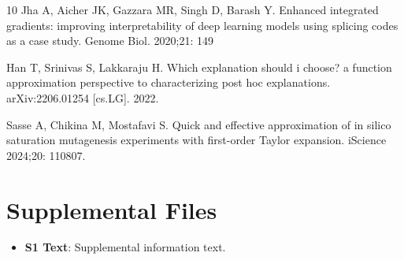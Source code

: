 \documentclass[10pt,letterpaper]{article}
\begin{document}
\begin{thebibliography}{10}
 Jha A, Aicher JK, Gazzara MR, Singh D, Barash Y. Enhanced integrated gradients: improving interpretability of deep learning models using splicing codes as a case study. Genome Biol. 2020;21: 149

 Han T, Srinivas S, Lakkaraju H. Which explanation should i choose? a function approximation perspective to characterizing post hoc explanations. arXiv:2206.01254 [cs.LG]. 2022.

 Sasse A, Chikina M, Mostafavi S. Quick and effective approximation of in silico saturation mutagenesis experiments with first-order Taylor expansion. iScience 2024;20: 110807. 

\end{thebibliography}



\section*{Supplemental Files}
\begin{itemize}
\item \textbf{S1 Text}: Supplemental information text.
\end{itemize}
\end{document}
